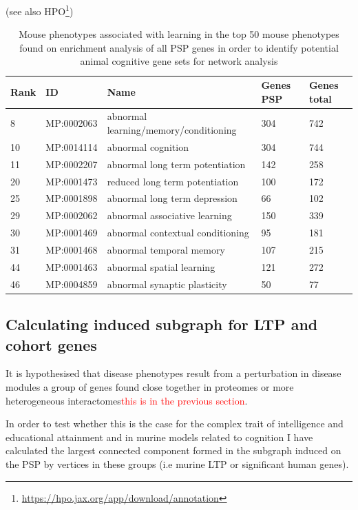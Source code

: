 (see also HPO\footnote{\url{https://hpo.jax.org/app/download/annotation}})
\begin{table}[]
    \centering
    \begin{tabular}{lllll}
    \toprule
    Rank & ID & Name & Genes PSP & Genes total\\
    \midrule
        8 & MP:0002063 & abnormal learning/memory/conditioning & 304 & 742  \\
        10 & MP:0014114 & abnormal cognition & 304 & 744 \\
        11 & MP:0002207 & abnormal long term potentiation & 142 & 258 \\
        20 & MP:0001473 & reduced long term potentiation & 100 & 172 \\
        25 & MP:0001898 & abnormal long term depression & 66 & 102 \\
        29 & MP:0002062 & abnormal associative learning & 150 & 339 \\
        30 & MP:0001469 & abnormal contextual conditioning & 95 & 181 \\
        31 & MP:0001468 & abnormal temporal memory & 107 & 215\\
        44 & MP:0001463 & abnormal spatial learning & 121 & 272\\
        46 & MP:0004859 &abnormal synaptic plasticity & 50 & 77 \\
        \bottomrule
    \end{tabular}
    \caption[Mammalian phenotypes (MP) associated with learning and long term potentiation]{Mouse phenotypes associated with learning in the top 50 mouse phenotypes found on enrichment analysis of all PSP genes in order to identify potential animal cognitive gene sets for network analysis}
    \label{tab:mouse_learning}
\end{table}

\subsection{Calculating induced subgraph for LTP and cohort genes}
\label{sec:method_induced_subgraph}
It is hypothesised that disease phenotypes result from a perturbation in disease modules a group of genes found close together in proteomes or more heterogeneous interactomes\cite{barabasi2011network}\textcolor{red}{this is in the previous section}. 

In order to test whether this is the case for the complex trait of intelligence and educational attainment and in murine models related to cognition I have calculated the largest connected component formed in the subgraph induced on the PSP by vertices in these groups (i.e murine LTP or significant human genes).

